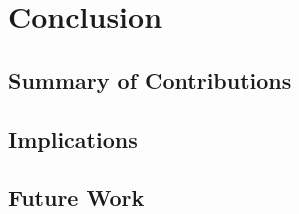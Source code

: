 \chapter{Conclusion}
\label{ch:conclusion}

\section{Summary of Contributions}
\label{sec:contributions-summary}

\section{Implications}
\label{sec:implications}

\section{Future Work}
\label{sec:future-work}
